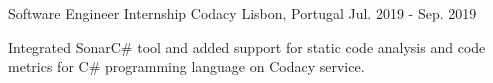 \begin{cventries}
  \cventry
    {Software Engineer Internship} %
    {Codacy} %
    {Lisbon, Portugal} %
    {Jul. 2019 - Sep. 2019} %
    {
      \begin{cvitems} %
        \item {Integrated SonarC\# tool and added support for static code analysis and code metrics for C\# programming language on Codacy service.}
      \end{cvitems}
    }

\end{cventries}
